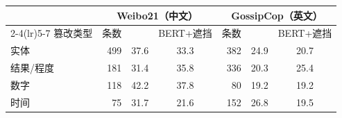 \begin{tabular}{lrccrcc}
\toprule
 & \multicolumn{3}{c}{Weibo21（中文）} & \multicolumn{3}{c}{GossipCop（英文）} \\
\cmidrule(lr){2-4}\cmidrule(lr){5-7}
篡改类型 & 条数 & \method{} & BERT+遮挡 & 条数 & \method{} & BERT+遮挡 \\
\midrule
实体 & 499 & 37.6 & 33.3 & 382 & 24.9 & 20.7 \\
结果/程度 & 181 & 31.4 & 35.8 & 336 & 20.3 & 25.4 \\
数字 & 118 & 42.2 & 37.8 & 80 & 19.2 & 19.2 \\
时间 & 75 & 31.7 & 21.6 & 152 & 26.8 & 19.5 \\
\bottomrule
\end{tabular}
